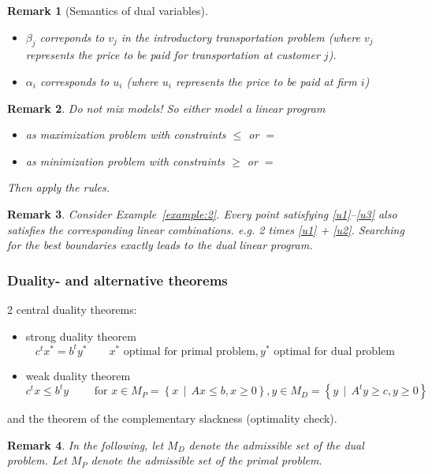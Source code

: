\documentclass[a4paper]{article}
\numberwithin{lecref}{subsection}
\newtheorem*{Remark}{Remark}
\newcommand{\SetDef}[2]{\left\{#1\,\mid\,#2\right\}}
\begin{document}
\begin{Remark}[Semantics of dual variables]
	\begin{itemize}
		\item $\beta_j$ correponds to $v_j$ in the introductory transportation problem (where $v_j$ represents the price to be paid for transportation at customer $j$).
		\item $\alpha_i$ corresponds to $u_i$ (where $u_i$ represents the price to be paid at firm $i$)
	\end{itemize}
\end{Remark}

\begin{Remark}
	Do \emph{not} mix models!
	So either model a linear program
	\begin{itemize}
		\item as maximization problem with constraints $\leq$ or $=$
		\item as minimization problem with constraints $\geq$ or $=$
	\end{itemize}
	Then apply the rules.
\end{Remark}

\begin{Remark}
	Consider Example~\ref{example:2}.
	Every point satisfying \eqref{u1}--\eqref{u3} also satisfies the corresponding linear combinations. e.g. 2 times \eqref{u1} + \eqref{u2}.
	Searching for the best boundaries exactly leads to the dual linear program.
\end{Remark}

\subsubsection{Duality- and alternative theorems}
\label{section:1.4.3}

2 central duality theorems:
\begin{itemize}
	\item strong duality theorem
		\[ c^t x^* = b^t y^* \qquad x^* \text{ optimal for primal problem}, y^* \text{ optimal for dual problem} \]
	\item weak duality theorem
		\[ c^t x \leq b^t y \qquad \text{ for } x \in M_P = \SetDef{x}{Ax \leq b, x \geq 0}, y \in M_D = \SetDef{y}{A^t y \geq c, y \geq 0} \]
\end{itemize}
and the theorem of the complementary slackness (optimality check).

\begin{Remark}
	In the following, let $M_D$ denote the admissible set of the dual problem.
	Let $M_P$ denote the admissible set of the primal problem.
\end{Remark}
\end{document}
